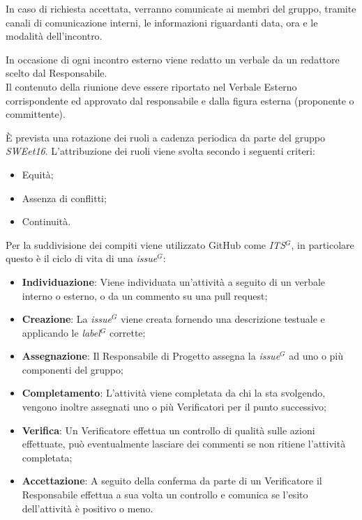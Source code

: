             In caso di richiesta accettata, verranno comunicate ai membri del gruppo, tramite canali di comunicazione interni, le informazioni riguardanti data, ora e le modalità dell'incontro.

            In occasione di ogni incontro esterno viene redatto un verbale da un redattore scelto dal Responsabile. \\
            Il contenuto della riunione deve essere riportato nel Verbale Esterno corrispondente ed approvato dal responsabile e dalla figura esterna (proponente o committente).


        È prevista una rotazione dei ruoli a cadenza periodica da parte del gruppo \textit{SWEet16}.
        L'attribuzione dei ruoli viene svolta secondo i seguenti criteri:

\begin{itemize}
\item Equità;
\item Assenza di conflitti;
\item Continuità.
\end{itemize}


        Per la suddivisione dei compiti viene utilizzato GitHub come \emph{ITS}$^{G}$, in particolare questo è il ciclo di vita di una \emph{issue}$^{G}$:

\begin{itemize}
\item \textbf{Individuazione}: Viene individuata un'attività a seguito di un verbale interno o esterno, o da un commento su una pull request;
\item \textbf{Creazione}: La \emph{issue}$^{G}$ viene creata fornendo una descrizione testuale e applicando le \emph{label}$^{G}$ corrette;
\item \textbf{Assegnazione}: Il Responsabile di Progetto assegna la \emph{issue}$^{G}$ ad uno o più componenti del gruppo;
\item \textbf{Completamento}: L'attività viene completata da chi la sta svolgendo, vengono inoltre assegnati uno o più Verificatori per il punto successivo;
\item \textbf{Verifica}: Un Verificatore effettua un controllo di qualità sulle azioni effettuate, può eventualmente lasciare dei commenti se non ritiene l'attività completata;
\item \textbf{Accettazione}: A seguito della conferma da parte di un Verificatore il Responsabile effettua a sua volta un controllo e comunica se l'esito dell'attività è positivo o meno.
\end{itemize}

